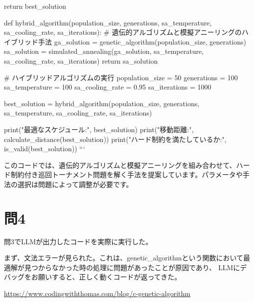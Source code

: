 \documentclass[11pt, twocolumn]{ltjsarticle}
\begin{document}
    return best_solution

def hybrid_algorithm(population_size, generations, sa_temperature, sa_cooling_rate, sa_iterations):
    # 遺伝的アルゴリズムと模擬アニーリングのハイブリッド手法
    ga_solution = genetic_algorithm(population_size, generations)
    sa_solution = simulated_annealing(ga_solution, sa_temperature, sa_cooling_rate, sa_iterations)
    return sa_solution

# ハイブリッドアルゴリズムの実行
population_size = 50
generations = 100
sa_temperature = 100
sa_cooling_rate = 0.95
sa_iterations = 1000

best_solution = hybrid_algorithm(population_size, generations, sa_temperature, sa_cooling_rate, sa_iterations)

print("最適なスケジュール:", best_solution)
print("移動距離:", calculate_distance(best_solution))
print("ハード制約を満たしているか:", is_valid(best_solution))
```

このコードでは、遺伝的アルゴリズムと模擬アニーリングを組み合わせて、ハード制約付き巡回トーナメント問題を解く手法を提案しています。パラメータや手法の選択は問題によって調整が必要です。

\section{問4}
問3でLLMが出力したコードを実際に実行した。

まず、文法エラーが見られた。これは、genetic_algorithmという関数において最適解が見つからなかった時の処理に問題があったことが原因であり、
LLMにデバッグをお願いすると、正しく動くコードが返ってきた。



\begin{thebibliography}{5}

     \url{https://www.codingwiththomas.com/blog/c-genetic-algorithm} 
    \end{thebibliography}
\end{document}
